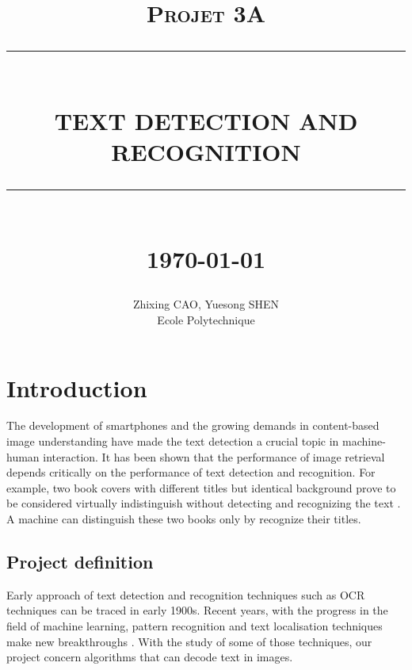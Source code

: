 \documentclass[paper=a4, french, 11pt]{scrartcl}
\newcommand{\HRule}[1]{\rule{\linewidth}{#1}}
\begin{document}
\title{ \normalsize \textsc{Projet 3A}
        \\ [2.0cm]
        \HRule{0.5pt} \\
        \LARGE \textbf{\uppercase{Text detection and recognition}}
        \HRule{2pt} \\ [0.5cm]
        \normalsize \today \vspace*{5\baselineskip}}

\date{}

\author{
        Zhixing CAO, Yuesong SHEN \\
        Ecole Polytechnique }

\maketitle
\newpage
\tableofcontents
\newpage

\sectionfont{\scshape}



\section{Introduction} \mbox{} \vspace{-0.5cm}

The development of smartphones and the growing demands in content-based image understanding have made the text detection a crucial topic in machine-human interaction. It has been shown that the performance of image retrieval depends critically on the performance of text detection and recognition. For example, two book covers with different titles but identical background prove to be considered virtually indistinguish without detecting and recognizing the text \cite{epshtein2010detecting}. A machine can distinguish these two books only by recognize their titles.

\subsection{Project definition} \mbox{} \vspace{-0.5cm}

Early approach of text detection and recognition techniques such as OCR techniques can be traced in early 1900s. Recent years, with the progress in the field of machine learning, pattern recognition and text localisation techniques make new breakthroughs \cite{anzai2012pattern}. With the study of some of those techniques, our project concern algorithms that can decode text in images.
\end{document}
